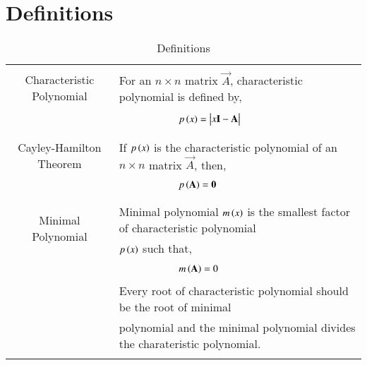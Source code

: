 \documentclass[journal,12pt]{IEEEtran}
\begin{document}
\section{\textbf{Definitions}}
\renewcommand{\thetable}{1}
\begin{table}[ht!]
\centering
\begin{tabular}{|c|l|}
    \hline
	\multirow{3}{*}{Characteristic Polynomial} 
	& \\
	& For an $n\times n$ matrix $\vec{A}$, characteristic polynomial is defined by,\\
	&\\
	& $\qquad\qquad\qquad p\brak{x}=\mydet{x\Vec{I}-\Vec{A}}$\\
	&\\
	\hline
	\multirow{3}{*}{Cayley-Hamilton Theorem}
    &\\
    & If $p\left(x\right)$ is the characteristic polynomial of an $n\times n$ matrix $\vec{A}$, then,\\
    &\\
    &$\qquad \qquad \qquad p\left(\mathbf{A}\right)=\mathbf{0}$\\
    &\\
    \hline
	\multirow{3}{*}{Minimal Polynomial} 
	&\\
	& Minimal polynomial $m\left(x\right)$ is the smallest factor of characteristic polynomial\\
	& $p\left(x\right)$ such that,\\
	&\\
	& $\qquad \qquad \qquad m\left(\mathbf{A}\right)=0$\\
	& \\
	& Every root of characteristic polynomial should be the root of minimal\\
	& polynomial and the minimal polynomial divides the charateristic polynomial.\\
	&\\
    \hline
\end{tabular}
\label{table:1}
    \caption{Definitions}
\end{table}
\newpage
\end{document}
